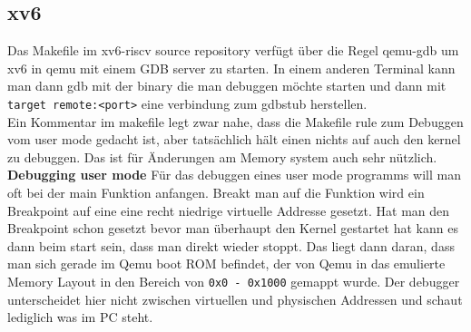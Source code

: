 \subsection{xv6}
Das Makefile im xv6-riscv source repository verfügt über die Regel qemu-gdb um xv6 in qemu
mit einem GDB server zu starten. In einem anderen Terminal kann man dann gdb mit der binary
die man debuggen möchte starten und dann mit \texttt{target remote:<port>} eine verbindung
zum gdbstub herstellen.\\
Ein Kommentar im makefile legt zwar nahe, dass die Makefile rule zum Debuggen vom user mode
gedacht ist, aber tatsächlich hält einen nichts auf auch den kernel zu debuggen. Das ist
für Änderungen am Memory system auch sehr nützlich.\\
\textbf{Debugging user mode} Für das debuggen eines user mode programms will man oft bei
der main Funktion anfangen. Breakt man auf die Funktion wird ein Breakpoint auf eine eine recht
niedrige virtuelle Addresse gesetzt. Hat man den Breakpoint schon gesetzt bevor man überhaupt
den Kernel gestartet hat kann es dann beim start sein, dass man direkt wieder stoppt.
Das liegt dann daran, dass man sich gerade im Qemu boot ROM befindet, der von Qemu in
das emulierte Memory Layout in den Bereich von \texttt{0x0 - 0x1000} gemappt wurde.
Der debugger unterscheidet hier nicht zwischen virtuellen und physischen Addressen und
schaut lediglich was im PC steht.

